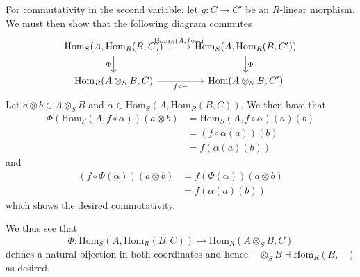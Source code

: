 \documentclass[a4paper]{article}
\begin{document}
\begin{exercise}{5}
  For commutativity in the second variable, let $ g: C \to C' $ be an $ R $-linear morphism. We must then show that the following diagram commutes
  \[\begin{tikzcd}
	  {\text{Hom}_S(A, \text{Hom}_R(B,C))} & {\text{Hom}_S(A, \text{Hom}_R(B,C'))} \\
	  {\text{Hom}_R(A\otimes_S B, C)} & {\text{Hom}(A \otimes_S B, C')}
	  \arrow["{\text{Hom}_S(A, f\circ-)}", from=1-1, to=1-2]
	  \arrow["\Phi"', from=1-1, to=2-1]
	  \arrow["\Phi", from=1-2, to=2-2]
	  \arrow["{f \circ -}"', from=2-1, to=2-2]
  \end{tikzcd}\]
  Let $ a \otimes b \in A \otimes_{S} B $ and $ \alpha \in \text{Hom}_S(A, \text{Hom}_R(B, C)) $. We then have that
  \begin{align*}
    \Phi(\text{Hom}_S(A, f \circ \alpha))(a \otimes b) &= \text{Hom}_S(A, f\circ \alpha)(a)(b) \\
                                                       &= (f\circ \alpha(a))(b) \\
                                                       &= f(\alpha(a)(b))
  \end{align*}
  and
  \begin{align*}
    (f \circ \Phi(\alpha))(a \otimes b) &= f(\Phi(\alpha))(a \otimes b) \\
                                        &= f(\alpha(a)(b))
  \end{align*}
  which shows the desired commutativity.

  We thus see that
  \begin{equation*}
    \Phi: \text{Hom}_S(A, \text{Hom}_R(B, C)) \to \text{Hom}_R(A\otimes_{S}B, C)
  \end{equation*}
  defines a natural bijection in both coordinates and hence $- \otimes_S B \dashv \text{Hom}_R(B, -)$ as desired.
\end{exercise}
\end{document}
